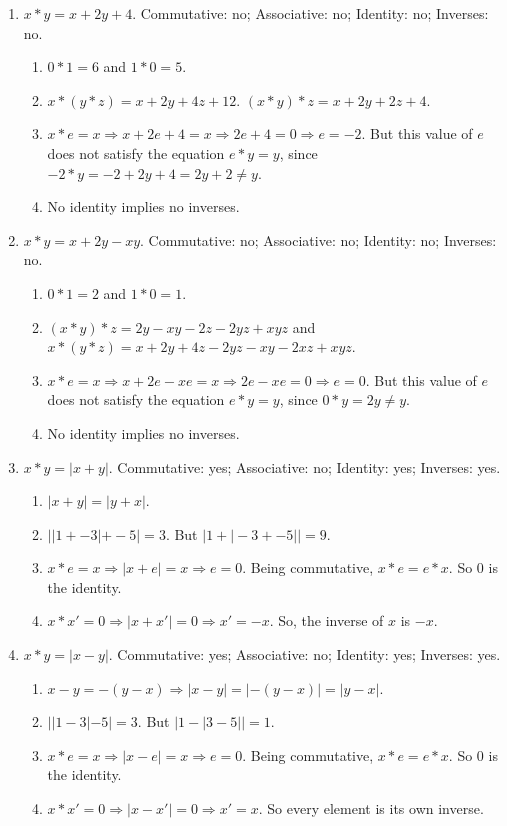 \documentclass{article}
\begin{document}
\begin{enumerate}
\item $x * y = x + 2y + 4$. Commutative: no; Associative: no; Identity: no; Inverses: no.
\begin{enumerate}[label=(\roman*)]
    \item $0 * 1 = 6$ and $1 * 0 = 5$.
    \item $x * (y * z) = x + 2y + 4z + 12$. $(x * y) * z = x + 2y + 2z + 4$.
    \item $x * e = x \Rightarrow x + 2e + 4 = x \Rightarrow 2e + 4 = 0 \Rightarrow e = -2$. But this value of $e$ does not satisfy the equation $e * y = y$, since $-2 * y = -2 + 2y + 4 = 2y + 2 \ne y$.
    \item No identity implies no inverses.
\end{enumerate}

\item $x * y = x + 2y - xy$. Commutative: no; Associative: no; Identity: no; Inverses: no.
\begin{enumerate}[label=(\roman*)]
    \item $0 * 1 = 2$ and $1 * 0 = 1$.
    \item $(x * y) * z = 2y - xy - 2z - 2yz + xyz$ and $x * (y * z) = x + 2y + 4z - 2yz - xy - 2xz + xyz$.
    \item $x * e = x \Rightarrow x + 2e - xe = x \Rightarrow 2e - xe = 0 \Rightarrow e = 0$. But this value of $e$ does not satisfy the equation $e * y = y$, since $0 * y = 2y \ne y$.
    \item No identity implies no inverses.
\end{enumerate}

\item $x * y = |x + y|$.  Commutative: yes; Associative: no; Identity: yes; Inverses: yes.
\begin{enumerate}[label=(\roman*)]
    \item $|x + y| = |y + x|$.
    \item $||1 + -3| + -5| = 3$. But $|1 + |-3 + -5|| = 9$.
    \item $x * e = x \Rightarrow |x + e| = x \Rightarrow e = 0$. Being commutative, $x * e = e * x$. So $0$ is the identity.
    \item $x * x' = 0 \Rightarrow |x + x'| = 0 \Rightarrow x' = -x$. So, the inverse of $x$ is $-x$.
\end{enumerate}

\item $x * y = |x - y|$.   Commutative: yes; Associative: no; Identity: yes; Inverses: yes.
\begin{enumerate}[label=(\roman*)]
    \item $x - y = -(y - x) \Rightarrow |x - y| = |-(y - x)| = |y - x|$.
    \item $||1 - 3| - 5| = 3$. But $|1 - |3 - 5|| = 1$.
    \item $x * e = x \Rightarrow |x - e| = x \Rightarrow e = 0$. Being commutative, $x * e = e * x$. So $0$ is the identity.
    \item $x * x' = 0 \Rightarrow |x - x'| = 0 \Rightarrow x' = x$. So every element is its own inverse.
\end{enumerate}


\end{enumerate}
\end{document}
